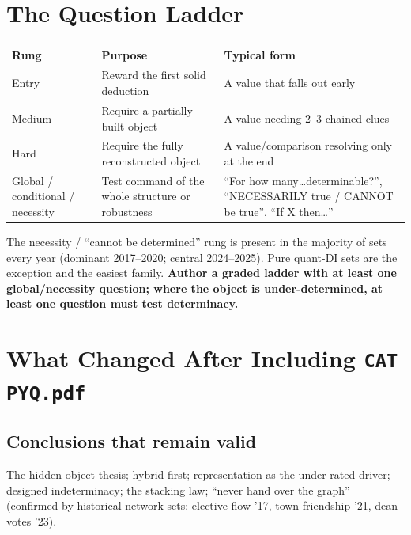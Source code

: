 \documentclass[11pt,a4paper]{article}
\begin{document}
\section{The Question Ladder}

\begin{center}
\begin{tabularx}{\textwidth}{lYY}
\toprule
\textbf{Rung} & \textbf{Purpose} & \textbf{Typical form} \\
\midrule
Entry & Reward the first solid deduction & A value that falls out early \\
Medium & Require a partially-built object & A value needing 2--3 chained clues \\
Hard & Require the fully reconstructed object & A value/comparison resolving only at the end \\
Global / conditional / necessity & Test command of the whole structure or robustness & ``For how many\ldots determinable?'', ``NECESSARILY true / CANNOT be true'', ``If X then\ldots'' \\
\bottomrule
\end{tabularx}
\end{center}

The necessity / ``cannot be determined'' rung is present in the majority of sets every year (dominant 2017--2020; central 2024--2025). Pure quant-DI sets are the exception and the easiest family. \textbf{Author a graded ladder with at least one global/necessity question; where the object is under-determined, at least one question must test determinacy.}

\section{What Changed After Including \texttt{CAT PYQ.pdf}}

\subsection{Conclusions that remain valid}
The hidden-object thesis; hybrid-first; representation as the under-rated driver; designed indeterminacy; the stacking law; ``never hand over the graph'' (confirmed by historical network sets: elective flow ’17, town friendship ’21, dean votes ’23).
\end{document}
